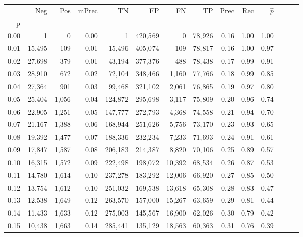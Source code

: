 \begin{tabular}{rrrrrrrrrrrrrr}
\toprule
{} &     Neg &    Pos & mPrec &       TN &       FP &      FN &      TP &  Prec &   Rec & $\hat{p}$ \\
p    &         &        &       &          &          &         &         &       &       &           \\
\midrule
0.00 &       1 &      0 &  0.00 &        1 &  420,569 &       0 &  78,926 &  0.16 &  1.00 &      1.00 \\
0.01 &  15,495 &    109 &  0.01 &   15,496 &  405,074 &     109 &  78,817 &  0.16 &  1.00 &      0.97 \\
0.02 &  27,698 &    379 &  0.01 &   43,194 &  377,376 &     488 &  78,438 &  0.17 &  0.99 &      0.91 \\
0.03 &  28,910 &    672 &  0.02 &   72,104 &  348,466 &   1,160 &  77,766 &  0.18 &  0.99 &      0.85 \\
0.04 &  27,364 &    901 &  0.03 &   99,468 &  321,102 &   2,061 &  76,865 &  0.19 &  0.97 &      0.80 \\
0.05 &  25,404 &  1,056 &  0.04 &  124,872 &  295,698 &   3,117 &  75,809 &  0.20 &  0.96 &      0.74 \\
0.06 &  22,905 &  1,251 &  0.05 &  147,777 &  272,793 &   4,368 &  74,558 &  0.21 &  0.94 &      0.70 \\
0.07 &  21,167 &  1,388 &  0.06 &  168,944 &  251,626 &   5,756 &  73,170 &  0.23 &  0.93 &      0.65 \\
0.08 &  19,392 &  1,477 &  0.07 &  188,336 &  232,234 &   7,233 &  71,693 &  0.24 &  0.91 &      0.61 \\
0.09 &  17,847 &  1,587 &  0.08 &  206,183 &  214,387 &   8,820 &  70,106 &  0.25 &  0.89 &      0.57 \\
0.10 &  16,315 &  1,572 &  0.09 &  222,498 &  198,072 &  10,392 &  68,534 &  0.26 &  0.87 &      0.53 \\
0.11 &  14,780 &  1,614 &  0.10 &  237,278 &  183,292 &  12,006 &  66,920 &  0.27 &  0.85 &      0.50 \\
0.12 &  13,754 &  1,612 &  0.10 &  251,032 &  169,538 &  13,618 &  65,308 &  0.28 &  0.83 &      0.47 \\
0.13 &  12,538 &  1,649 &  0.12 &  263,570 &  157,000 &  15,267 &  63,659 &  0.29 &  0.81 &      0.44 \\
0.14 &  11,433 &  1,633 &  0.12 &  275,003 &  145,567 &  16,900 &  62,026 &  0.30 &  0.79 &      0.42 \\
0.15 &  10,438 &  1,663 &  0.14 &  285,441 &  135,129 &  18,563 &  60,363 &  0.31 &  0.76 &      0.39 \\

\end{tabular}
